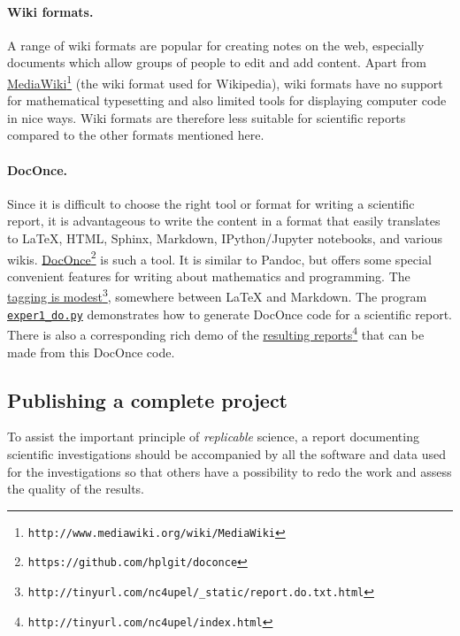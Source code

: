 \documentclass[graybox,sectrefs,envcountresetchap,open=right,final]{svmonodo}
\begin{document}
\paragraph{Wiki formats.}
A range of wiki formats are popular for creating notes on the web,
especially documents which allow groups of people to edit and add
content. Apart from \href{{http://www.mediawiki.org/wiki/MediaWiki}}{MediaWiki}\footnote{\texttt{http://www.mediawiki.org/wiki/MediaWiki}} (the wiki format used for
Wikipedia), wiki formats have no support for mathematical typesetting
and also limited tools for displaying computer code in nice ways.
Wiki formats are therefore less suitable for scientific reports compared
to the other formats mentioned here.


\paragraph{DocOnce.}
Since it is difficult to choose the right tool or format for writing a
scientific report, it is advantageous to write the content in a format
that easily translates to {\LaTeX}, HTML, Sphinx, Markdown,
IPython/Jupyter notebooks, and various wikis. \href{{https://github.com/hplgit/doconce}}{DocOnce}\footnote{\texttt{https://github.com/hplgit/doconce}} is such a tool. It is similar to
Pandoc, but offers some special convenient features for writing about
mathematics and programming.  The \href{{http://tinyurl.com/nc4upel/_static/report.do.txt.html}}{tagging is modest}\footnote{\texttt{http://tinyurl.com/nc4upel/\_static/report.do.txt.html}}, somewhere between
{\LaTeX} and Markdown.  The program \href{{http://tinyurl.com/p96acy2/exper1_do.py}}{\nolinkurl{exper1_do.py}} demonstrates how
to generate DocOnce code for a scientific report.
There is also a corresponding rich demo of the \href{{http://tinyurl.com/nc4upel/index.html}}{resulting reports}\footnote{\texttt{http://tinyurl.com/nc4upel/index.html}} that can be made from
this DocOnce code.


\subsection{Publishing a complete project}
\label{softeng1:exper:github}


To assist the important principle of \emph{replicable} science,
a report documenting scientific investigations should be accompanied by
all the software and data used for the investigations so that others
have a possibility to redo the work and assess the quality of the results.
\end{document}
